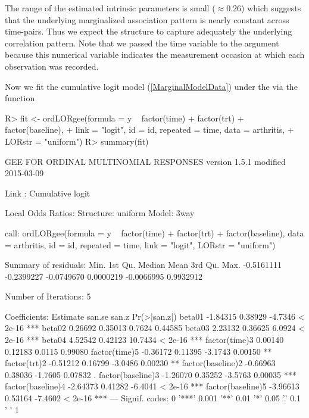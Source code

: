 \documentclass[article,shortnames,nojss]{jss}
\begin{document}
The range of the estimated intrinsic parameters is small ($\approx 0.26$) which suggests that the underlying marginalized association pattern is nearly constant across time-pairs. Thus we expect the  structure to capture adequately the underlying correlation pattern. Note that we passed the time variable to the  argument because this numerical variable indicates the measurement occasion at which each observation was recorded.

Now we fit the cumulative logit model (\ref{MarginalModelData}) under the  via the function  
\begin{Schunk}
\begin{Sinput}
R>  fit <- ordLORgee(formula = y ~ factor(time) + factor(trt) + factor(baseline),
+           link = "logit", id = id, repeated = time, data = arthritis,
+           LORstr = "uniform")
R>  summary(fit)
\end{Sinput}
\begin{Soutput}
GEE FOR ORDINAL MULTINOMIAL RESPONSES 
version 1.5.1 modified 2015-03-09 

Link : Cumulative logit 

Local Odds Ratios:
Structure:         uniform
Model:             3way

call:
ordLORgee(formula = y ~ factor(time) + factor(trt) + factor(baseline), 
    data = arthritis, id = id, repeated = time, link = "logit", 
    LORstr = "uniform")

Summary of residuals:
      Min.    1st Qu.     Median       Mean    3rd Qu.       Max. 
-0.5161111 -0.2399227 -0.0749670  0.0000219 -0.0066995  0.9932912 

Number of Iterations: 5 

Coefficients:
                  Estimate   san.se   san.z Pr(>|san.z|)    
beta01            -1.84315  0.38929 -4.7346      < 2e-16 ***
beta02             0.26692  0.35013  0.7624      0.44585    
beta03             2.23132  0.36625  6.0924      < 2e-16 ***
beta04             4.52542  0.42123 10.7434      < 2e-16 ***
factor(time)3      0.00140  0.12183  0.0115      0.99080    
factor(time)5     -0.36172  0.11395 -3.1743      0.00150 ** 
factor(trt)2      -0.51212  0.16799 -3.0486      0.00230 ** 
factor(baseline)2 -0.66963  0.38036 -1.7605      0.07832 .  
factor(baseline)3 -1.26070  0.35252 -3.5763      0.00035 ***
factor(baseline)4 -2.64373  0.41282 -6.4041      < 2e-16 ***
factor(baseline)5 -3.96613  0.53164 -7.4602      < 2e-16 ***
---
Signif. codes:  0 '***' 0.001 '**' 0.01 '*' 0.05 '.' 0.1 ' ' 1


\end{Soutput}
\end{Schunk}
\end{document}
